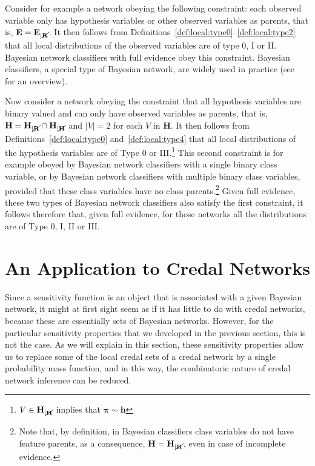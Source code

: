 \documentclass[10pt,a4paper]{paper}
\theoremstyle{definition}
\newcommand{\bpi}{\boldsymbol\pi}
\newcommand{\hyp}{\mathbf{h}}
\newcommand{\hyps}{\mathbf{H}}
\newcommand{\evs}{\mathbf{E}}
\newcommand{\restr}{_{|\cancel{\bf R}}}
\begin{document}
Consider for example a network obeying the following constraint: each observed variable only has hypothesis variables or other observed variables as parents, that is, $\evs=\evs\restr$.
It then follows from Definitions~\ref{def:local:type0}--\ref{def:local:type2} that all local distributions of the observed variables are of type 0, I or II. Bayesian network classifiers with full evidence obey this constraint. Bayesian classifiers, a special type of Bayesian network, are widely used in practice (see~\cite{Flores2012} for an overview).

Now consider a network obeying the constraint that all hypothesis variables are binary valued and can only have observed variables as parents, that is, $\hyps=\hyps_{|\cancel{\bf R}}\cap\hyps_{|\cancel{\bf H}}$ and $|V|=2$ for each $V$ in $\hyps$. It then follows from Definitions~\ref{def:local:type0} and~\ref{def:local:type4} that all local distributions of the hypothesis variables are of Type 0 or III.\footnote{$V\in\hyps_{|\cancel{\bf H}}$ implies that $\bpi\sim\hyp$} This second constraint is for example obeyed by Bayesian network classifiers with a single binary class variable, or by Bayesian network classifiers with multiple binary class variables, provided that these class variables have no class parents.\footnote{Note that, by definition, in Bayesian classifiers class variables do not have feature parents, as a consequence, $\hyps=\hyps_{|\cancel{\bf R}}$, even in case of incomplete evidence.} Given full evidence, these two types of Bayesian network classifiers also satisfy the first constraint, it follows therefore that, given full evidence, for those networks all the distributions are of Type 0, I, II or III.


\section{An Application to Credal Networks}\label{sec:credal}

Since a sensitivity function is an object that is associated with a given Bayesian network, it might at first sight seem as if it has little to do with credal networks, because these are essentially sets of Bayesian networks. However, for the particular sensitivity properties that we developed in the previous section, this is not the case. As we will explain in this section, these sensitivity properties allow us to replace some of the local credal sets of a credal network by a single probability mass function, and in this way, the combinatoric nature of credal network inference can be reduced.
\end{document}
